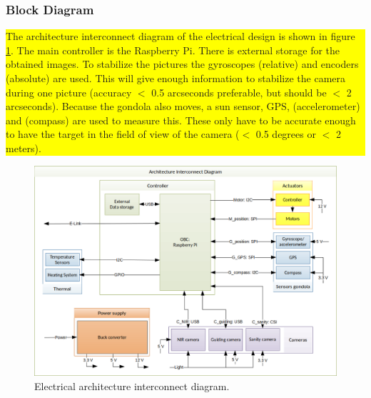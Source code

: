 \subsubsection{Block Diagram}
\label{sec:4.5.1}
\colorbox{yellow}{\parbox{\textwidth}{The architecture interconnect diagram of the electrical design is shown in figure \ref{fig:elec-AID}. The main controller is the Raspberry Pi. There is external storage for the obtained images. To stabilize the pictures the gyroscopes (relative) and encoders (absolute) are used. This will give enough information to stabilize the camera during one picture (accuracy $<$ 0.5 arcseconds preferable, but should be $<$ 2 arcseconds). Because the gondola also moves, a sun sensor, GPS,  (accelerometer) and (compass) are used to measure this. These only have to be accurate enough to have the target in the field of view of the camera ($<$ 0.5 degrees or $<$ 2 meters).}}
\vspace{-.5cm}
\begin{figure}[H]
	\centering
	\includegraphics[width=.85\textwidth]{4-experiment-design/img/electrical/ArchitectureInterconnect.png}
	\caption{Electrical architecture interconnect diagram.}
	\label{fig:elec-AID}
\end{figure}

